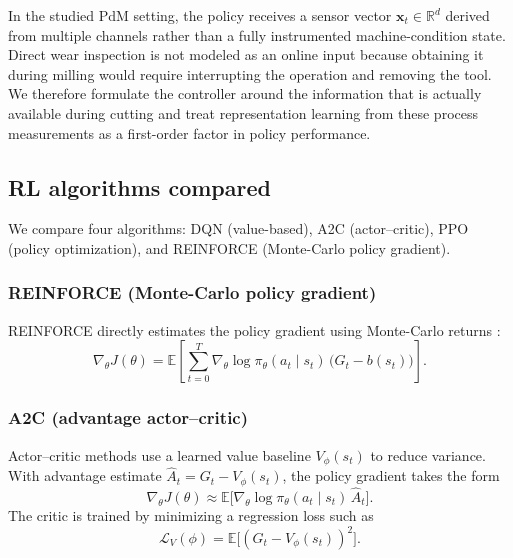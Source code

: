 \documentclass[sn-basic]{sn-jnl} %
\begin{document}
In the studied PdM setting, the policy receives a sensor vector $\mathbf{x}_t\in\mathbb{R}^d$ derived from multiple channels rather than a fully instrumented machine-condition state. Direct wear inspection is not modeled as an online input because obtaining it during milling would require interrupting the operation and removing the tool. We therefore formulate the controller around the information that is actually available during cutting and treat representation learning from these process measurements as a first-order factor in policy performance.
\label{sec:obs_model}
\subsection{RL algorithms compared}
\label{sec:algos}
We compare four algorithms: DQN (value-based), A2C (actor--critic), PPO (policy optimization), and REINFORCE (Monte-Carlo policy gradient).

\subsubsection{REINFORCE (Monte-Carlo policy gradient)}
REINFORCE directly estimates the policy gradient using Monte-Carlo returns \cite{Williams1992}:
\begin{equation}
\nabla_\theta J(\theta) = \mathbb{E}\left[\sum_{t=0}^{T} \nabla_\theta \log \pi_\theta(a_t\mid s_t)\,\big(G_t-b(s_t)\big)\right].
\end{equation}

\subsubsection{A2C (advantage actor--critic)}
Actor--critic methods use a learned value baseline $V_\phi(s_t)$ to reduce variance. With advantage estimate $\hat{A}_t=G_t-V_\phi(s_t)$, the policy gradient takes the form
\begin{equation}
\nabla_\theta J(\theta) \approx \mathbb{E}\big[\nabla_\theta\log\pi_\theta(a_t\mid s_t)\,\hat{A}_t\big].
\end{equation}
The critic is trained by minimizing a regression loss such as
\begin{equation}
\mathcal{L}_V(\phi)=\mathbb{E}\big[(G_t - V_\phi(s_t))^2\big].
\end{equation}
\end{document}
